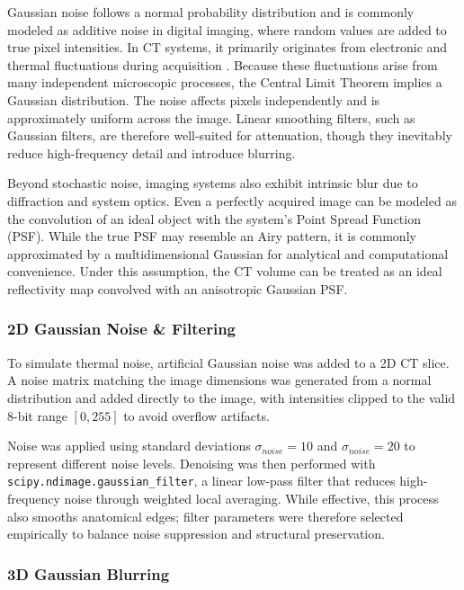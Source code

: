\documentclass[10pt, twocolumn]{article}
\begin{document}
Gaussian noise follows a normal probability distribution and is commonly modeled as additive noise in digital imaging, where random values are added to true pixel intensities. In CT systems, it primarily originates from electronic and thermal fluctuations during acquisition \cite{alrabaieMultipleNoisesRemoval2018}. Because these fluctuations arise from many independent microscopic processes, the Central Limit Theorem implies a Gaussian distribution. The noise affects pixels independently and is approximately uniform across the image. Linear smoothing filters, such as Gaussian filters, are therefore well-suited for attenuation, though they inevitably reduce high-frequency detail and introduce blurring.

Beyond stochastic noise, imaging systems also exhibit intrinsic blur due to diffraction and system optics. Even a perfectly acquired image can be modeled as the convolution of an ideal object with the system’s Point Spread Function (PSF). While the true PSF may resemble an Airy pattern, it is commonly approximated by a multidimensional Gaussian for analytical and computational convenience. Under this assumption, the CT volume can be treated as an ideal reflectivity map convolved with an anisotropic Gaussian PSF.

\subsubsection{2D Gaussian Noise \& Filtering}

To simulate thermal noise, artificial Gaussian noise was added to a 2D CT slice. A noise matrix matching the image dimensions was generated from a normal distribution and added directly to the image, with intensities clipped to the valid 8-bit range $[0,255]$ to avoid overflow artifacts.

Noise was applied using standard deviations $\sigma_{noise} = 10$ and $\sigma_{noise} = 20$ to represent different noise levels. Denoising was then performed with \texttt{scipy.ndimage.gaussian\_filter}, a linear low-pass filter that reduces high-frequency noise through weighted local averaging. While effective, this process also smooths anatomical edges; filter parameters were therefore selected empirically to balance noise suppression and structural preservation.

\subsubsection{3D Gaussian Blurring}
\end{document}
